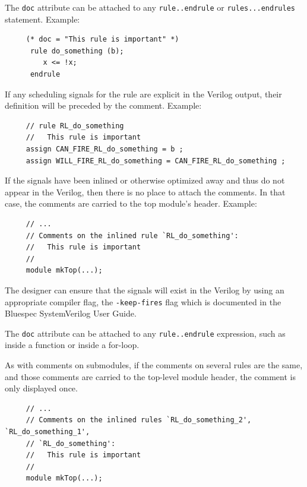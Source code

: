 \documentclass[twoside,letterpaper]{article}
\newcommand{\blue}{Bluespec SystemVerilog}
\newcommand{\te}[1]{\texttt{#1}}
\begin{document}
The \te{doc} attribute can be attached to any \te{rule..endrule} or
\te{rules...endrules} statement. Example: 
\begin{verbatim}
     (* doc = "This rule is important" *)
      rule do_something (b);
         x <= !x;
      endrule
\end{verbatim}
If any scheduling signals for the rule are explicit in the Verilog
output, their definition will be preceded by the comment.  Example:
\begin{verbatim}
     // rule RL_do_something
     //   This rule is important
     assign CAN_FIRE_RL_do_something = b ;
     assign WILL_FIRE_RL_do_something = CAN_FIRE_RL_do_something ;
\end{verbatim}
If the signals have been inlined or otherwise optimized away and thus
do not appear in the Verilog, then there is no place to attach the
comments.  In that case, the comments are carried to the top module's
header.  Example:
\begin{verbatim}
     // ...
     // Comments on the inlined rule `RL_do_something':
     //   This rule is important
     //
     module mkTop(...);
\end{verbatim}
The designer can ensure that the signals will exist in the Verilog
by using an appropriate compiler flag, the \te{-keep-fires} flag which
is documented in the {\blue} User Guide.

The \te{doc} attribute can be attached to any \te{rule..endrule} expression,
such as inside a function or inside a for-loop.

As with comments on submodules, if the  comments on several rules are the
same, and those comments are carried to the top-level module header, the comment is only displayed once.
\begin{verbatim}
     // ...
     // Comments on the inlined rules `RL_do_something_2', `RL_do_something_1',
     // `RL_do_something':
     //   This rule is important
     //
     module mkTop(...);
\end{verbatim}

\end{document}
